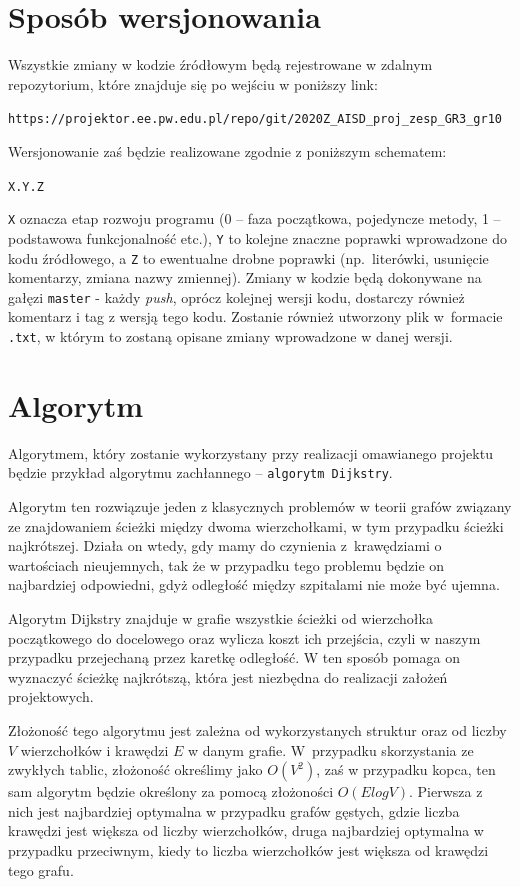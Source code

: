 \documentclass[12pt,a4paper]{article}
\begin{document}
\section{Sposób wersjonowania} 
Wszystkie zmiany w kodzie źródłowym będą rejestrowane w zdalnym repozytorium, które znajduje się po wejściu w poniższy link:\begin{center}
\small{\texttt{https://projektor.ee.pw.edu.pl/repo/git/2020Z\_AISD\_proj\_zesp\_GR3\_gr10}}
\end{center}
Wersjonowanie zaś będzie realizowane zgodnie z poniższym schematem:
\begin{center}
\texttt{X.Y.Z}
\end{center}
\texttt{X} oznacza etap rozwoju programu (0 – faza początkowa, pojedyncze metody, 1 – podstawowa funkcjonalność etc.), \texttt{Y} to kolejne znaczne poprawki wprowadzone do kodu źródłowego, a \texttt{Z} to ewentualne drobne poprawki (np.~literówki, usunięcie komentarzy, zmiana nazwy zmiennej).
Zmiany w kodzie będą dokonywane na gałęzi \texttt{master} - każdy \textit{push}, oprócz kolejnej wersji kodu, dostarczy również komentarz i tag z wersją tego kodu. Zostanie również utworzony plik w~formacie \texttt{.txt}, w którym to zostaną opisane zmiany wprowadzone w danej wersji.


\section{Algorytm}

Algorytmem, który zostanie wykorzystany przy realizacji omawianego projektu będzie przykład algorytmu zachłannego – \texttt{algorytm Dijkstry}.

Algorytm ten rozwiązuje jeden z klasycznych problemów w teorii grafów związany ze znajdowaniem ścieżki między dwoma wierzchołkami, w tym przypadku ścieżki najkrótszej. Działa on wtedy, gdy mamy do czynienia z~krawędziami o wartościach nieujemnych, tak że w przypadku tego problemu będzie on najbardziej odpowiedni, gdyż odległość między szpitalami nie może być ujemna.

Algorytm Dijkstry znajduje w grafie wszystkie ścieżki od wierzchołka początkowego do docelowego oraz wylicza koszt ich przejścia, czyli w naszym przypadku przejechaną przez karetkę odległość. W ten sposób pomaga on wyznaczyć ścieżkę najkrótszą, która jest niezbędna do realizacji założeń projektowych.

Złożoność tego algorytmu jest zależna od wykorzystanych struktur oraz od liczby \texttt{$V$} wierzchołków i krawędzi \texttt{$E$} w danym grafie. W~przypadku skorzystania ze zwykłych tablic, złożoność określimy jako \texttt{$O(V^{2})$}, zaś w przypadku kopca, ten sam algorytm będzie określony za pomocą złożoności \texttt{$O(ElogV)$}. Pierwsza z nich jest najbardziej optymalna w przypadku grafów gęstych, gdzie liczba krawędzi jest większa od liczby wierzchołków, druga najbardziej optymalna w przypadku przeciwnym, kiedy to liczba wierzchołków jest większa od krawędzi tego grafu.
\newpage
\end{document}
